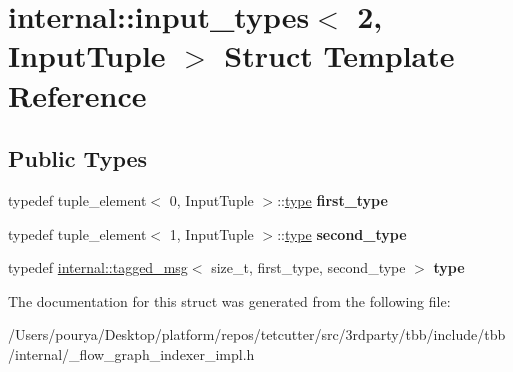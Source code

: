 \hypertarget{structinternal_1_1input__types_3_012_00_01InputTuple_01_4}{}\section{internal\+:\+:input\+\_\+types$<$ 2, Input\+Tuple $>$ Struct Template Reference}
\label{structinternal_1_1input__types_3_012_00_01InputTuple_01_4}
\subsection*{Public Types}
\begin{DoxyCompactItemize}
\item 
\hypertarget{structinternal_1_1input__types_3_012_00_01InputTuple_01_4_adebcf8a62b51ea9c2368384239f08277}{}typedef tuple\+\_\+element$<$ 0, Input\+Tuple $>$\+::\hyperlink{classinternal_1_1tagged__msg}{type} {\bfseries first\+\_\+type}\label{structinternal_1_1input__types_3_012_00_01InputTuple_01_4_adebcf8a62b51ea9c2368384239f08277}

\item 
\hypertarget{structinternal_1_1input__types_3_012_00_01InputTuple_01_4_ab5b727599ba7eefa053cef539624513f}{}typedef tuple\+\_\+element$<$ 1, Input\+Tuple $>$\+::\hyperlink{classinternal_1_1tagged__msg}{type} {\bfseries second\+\_\+type}\label{structinternal_1_1input__types_3_012_00_01InputTuple_01_4_ab5b727599ba7eefa053cef539624513f}

\item 
\hypertarget{structinternal_1_1input__types_3_012_00_01InputTuple_01_4_a7ec7720c83897287fc91d278f2ba73d4}{}typedef \hyperlink{classinternal_1_1tagged__msg}{internal\+::tagged\+\_\+msg}$<$ size\+\_\+t, first\+\_\+type, second\+\_\+type $>$ {\bfseries type}\label{structinternal_1_1input__types_3_012_00_01InputTuple_01_4_a7ec7720c83897287fc91d278f2ba73d4}

\end{DoxyCompactItemize}


The documentation for this struct was generated from the following file\+:\begin{DoxyCompactItemize}
\item 
/\+Users/pourya/\+Desktop/platform/repos/tetcutter/src/3rdparty/tbb/include/tbb/internal/\+\_\+flow\+\_\+graph\+\_\+indexer\+\_\+impl.\+h\end{DoxyCompactItemize}
